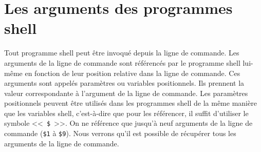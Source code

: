 %
%


\setcounter{remarque-cnt}{1}
\setcounter{example-cnt}{1}
\chapter{Les arguments des programmes shell}
\thispagestyle{fancy}

Tout programme shell peut {\^e}tre invoqu{\'e} depuis la ligne de
commande. Les arguments de la ligne de commande
sont r{\'e}f{\'e}renc{\'e}s par le programme shell lui-m{\^e}me en
fonction de leur position relative dans la ligne de commande. Ces
arguments sont appel{\'e}s param{\`e}tres ou
variables positionnels. Ils prennent la
valeur correspondante {\`a} l'argument de la ligne de commande. Les
param{\`e}tres positionnels peuvent {\^e}tre utilis{\'e}s dans les
programmes shell de la m{\^e}me mani{\`e}re que les variables shell,
c'est-{\`a}-dire que pour les r{\'e}f{\'e}rencer, il suffit d'utiliser
le symbole <<~\verb=$=~>>. On ne r{\'e}f{\'e}rence que jusqu'{\`a} neuf
arguments de la ligne de commande (\verb=$1= {\`a} \verb=$9=). Nous
verrons qu'il est possible de r{\'e}cup{\'e}rer tous les arguments de la
ligne de commande.


